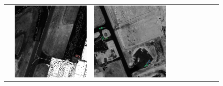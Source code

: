 \begin{figure}[h!]
\begin{tabularx}{\textwidth}{c|*{9}{X}}
    &  \includegraphics[trim={650pt 120pt 170pt 720pt},clip,width=\linewidth]{images/015Results/03ablation/comp_images/ndvi/487.png}
    & \includegraphics[trim={230pt 200pt 680pt 725pt},clip,width=\linewidth]{images/015Results/03ablation/comp_images/ndvi/509.png}

\end{tabularx}
\end{figure}
